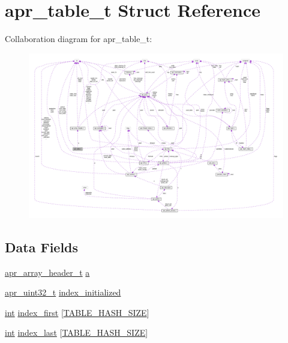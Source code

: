 \hypertarget{structapr__table__t}{}\section{apr\+\_\+table\+\_\+t Struct Reference}
\label{structapr__table__t}


Collaboration diagram for apr\+\_\+table\+\_\+t\+:
\nopagebreak
\begin{figure}[H]
\begin{center}
\leavevmode
\includegraphics[width=350pt]{structapr__table__t__coll__graph}
\end{center}
\end{figure}
\subsection*{Data Fields}
\begin{DoxyCompactItemize}
\item 
\hyperlink{structapr__array__header__t}{apr\+\_\+array\+\_\+header\+\_\+t} \hyperlink{structapr__table__t_aed61d856f36189af31f74303f6637d4a}{a}
\item 
\hyperlink{group__apr__platform_ga558548a135d8a816c4787250744ea147}{apr\+\_\+uint32\+\_\+t} \hyperlink{structapr__table__t_a52a95dfc523ae09ce1ef5c522f1a3225}{index\+\_\+initialized}
\item 
\hyperlink{pcre_8txt_a42dfa4ff673c82d8efe7144098fbc198}{int} \hyperlink{structapr__table__t_ac2f6d9a430b665cd0efacf5de7dba7e8}{index\+\_\+first} \mbox{[}\hyperlink{apr__tables_8c_aad180ad390cbeb4a3c424261c8188263}{T\+A\+B\+L\+E\+\_\+\+H\+A\+S\+H\+\_\+\+S\+I\+ZE}\mbox{]}
\item 
\hyperlink{pcre_8txt_a42dfa4ff673c82d8efe7144098fbc198}{int} \hyperlink{structapr__table__t_a3047719ed68d7a329705aab5faee819c}{index\+\_\+last} \mbox{[}\hyperlink{apr__tables_8c_aad180ad390cbeb4a3c424261c8188263}{T\+A\+B\+L\+E\+\_\+\+H\+A\+S\+H\+\_\+\+S\+I\+ZE}\mbox{]}
\end{DoxyCompactItemize}


